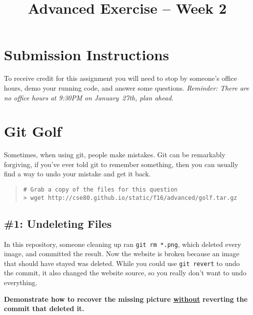 \documentclass{article}
\begin{document}
\fancyfoot[C]{\color{gray} \thepage~/~\pageref*{LastPage}}
\pagestyle{fancyplain}


\title{\textbf{Advanced Exercise -- Week 2\\}}
\author{\textbf{\color{red}{Due: Before January 27, 10:00PM}}}
\date{}
\maketitle


\section*{Submission Instructions}
To receive credit for this assignment you will need to stop by someone's
office hours, demo your running code, and answer some questions.
%
\emph{Reminder: There are no office hours at 9:30PM on January~27th, plan ahead.}


\section{Git Golf}

Sometimes, when using git, people make mistakes. Git can be remarkably
forgiving, if you've ever told git to remember something, then you can usually
find a way to undo your mistake and get it back.

\begin{quote}
\begin{lstlisting}
# Grab a copy of the files for this question
> wget http://cse80.github.io/static/f16/advanced/golf.tar.gz
\end{lstlisting}
\end{quote}

\subsection*{\#1: Undeleting Files}

In this repository, someone cleaning up ran
\texttt{git~rm~*.png}, which deleted every image, and committed the result.
Now the website is broken because an image that should have stayed was
deleted. While you could use \texttt{git~revert} to undo the commit, it also
changed the website source, so you really don't want to undo everything.

\noindent
\textbf{Demonstrate how to recover the missing picture \ul{without} reverting
the commit that deleted it.}
\end{document}
